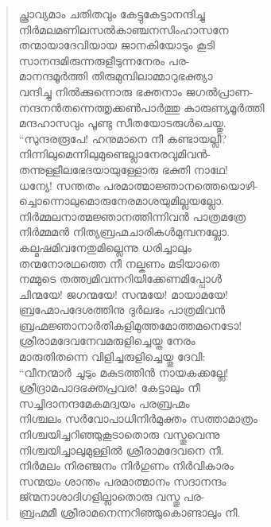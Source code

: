 \begin{verse}
ച്ഛ്രാവ്യമാം ചതിതവും കേട്ടുകേട്ടാനന്ദിച്ചു\\
നിര്‍മലമണിലസല്‍കാഞ്ചനസിംഹാസനേ\\
തന്മായാദേവിയായ ജാനകിയോടും കൂടി\\
സാനന്ദമിരുന്നരുളീടുന്നനേരം പര-\\
മാനന്ദമൂര്‍ത്തി തിരുമുമ്പിലാമ്മാറുഭക്ത്യാ\\
വന്ദിച്ചു നില്‍ക്കുന്നൊരു ഭക്തനാം ജഗല്‍പ്രാണ-\\
നന്ദനന്‍തന്നെത്തൃക്കണ്‍പാര്‍ത്തു കാരുണ്യമൂര്‍ത്തി\\
മന്ദഹാസവും പൂണ്ടു സീതയോടരുള്‍ചെയ്തു.\\
“സുന്ദരരൂപേ! ഹനുമാനെ നീ കണ്ടായല്ലീ?\\
നിന്നിലുമെന്നിലുമുണ്ടെല്ലാനേരവുമിവന്‍-\\
തന്നുള്ളീലഭേദയായുള്ളോരു ഭക്തി നാഥേ!\\
ധന്യേ! സന്തതം പരമാത്മാജ്ഞാനത്തെയൊഴി-\\
ച്ചൊന്നൊലുമൊരുനേരമാശയുമില്ലയല്ലോ.\\
നിര്‍മ്മലനാത്മജ്ഞാനത്തിന്നിവന്‍ പാത്രമത്രേ\\
നിര്‍മ്മമന്‍ നിത്യബ്രഹ്മചാരികള്‍മുമ്പനല്ലോ.\\
കല്മഷമിവനേതുമില്ലെന്നു ധരിച്ചാലും\\
തന്മനോരഥത്തെ നീ നല്കണം മടിയാതെ\\
നമ്മുടെ തത്ത്വമിവന്നറിയിക്കേണമിപ്പോള്‍\\
ചിന്മയേ! ജഗന്മയേ! സന്മയേ! മായാമയേ!\\
ബ്രഹ്മോപദേശത്തിനു ദുര്‍ലഭം പാത്രമിവന്‍\\
ബ്രഹ്മജ്ഞാനാര്‍തികളിമുത്തമോത്തമനെടോ!\\
ശ്രീരാമദേവനേവമരുളിച്ചെയ്ത നേരം\\
മാരുതിതന്നെ വിളിച്ചരുളിച്ചെയ്തു ദേവി:\\
“വീനന്മാര്‍ ചൂടും മകുടത്തിന്‍ നായകക്കല്ലേ!\\
ശ്രീദ്രാമപാദഭക്തപ്രവര! കേട്ടാലും നീ\\
സച്ചിദാനന്ദമേകമദ്വയം പരബ്രഹ്മം\\
നിശ്ചലം സര്‍വോപാധിനിര്‍മുക്തം സത്താമാത്രം\\
നിശ്ചയിച്ചറിഞ്ഞുകൂടാതൊരു വസ്തുവെന്നു\\
നിശ്ചയിച്ചാലുമുള്ളില്‍ ശ്രീരാമദേവനെ നീ.\\
നിര്‍മലം നിരഞ്ജനം നിര്‍ഗുണം നിര്‍വികാരം\\
സന്മയം ശാന്തം പരമാത്മാനം സദാനന്ദം\\
ജ്ന്മനാശാദിഗളില്ലാതൊരു വസ്തു പര-\\
ബ്രഹ്മമീ ശ്രീരാമനെന്നറിഞ്ഞുകൊണ്ടാലും നീ.\\

\end{verse}
